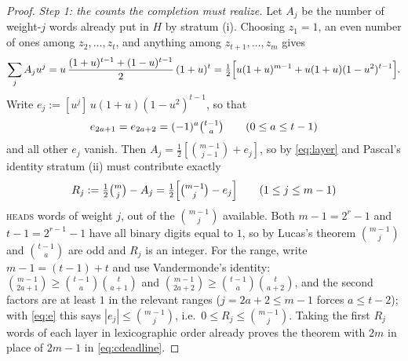 \documentclass[11pt]{article}
\theoremstyle{remark}
\newcommand{\head}{\textnormal{\textsc{heads}}}
\begin{document}
\begin{proof}
\emph{Step 1: the counts the completion must realize.} Let $A_j$ be the
number of weight-$j$ words already put in $H$ by stratum (i). Choosing $z_1=1$,
an even number of ones among $z_2,\dots,z_t$, and anything among
$z_{t+1},\dots,z_m$ gives
\[
\sum_j A_j u^j
= u\,\frac{(1+u)^{t-1}+(1-u)^{t-1}}2\,(1+u)^{t}
= \tfrac12\Bigl[u(1+u)^{m-1}+u(1+u)(1-u^2)^{t-1}\Bigr].
\]
Write $e_j:=[u^j]\,u(1+u)(1-u^2)^{t-1}$, so that
\begin{equation}\label{eq:e}
e_{2a+1}=e_{2a+2}=(-1)^a\tbinom{t-1}a \qquad (0\le a\le t-1)
\end{equation}
and all other $e_j$ vanish. Then $A_j=\tfrac12[\binom{m-1}{j-1}+e_j]$, so by
\eqref{eq:layer} and Pascal's identity stratum (ii) must contribute exactly
\begin{equation}\label{eq:R}
R_j:=\tfrac12\tbinom mj-A_j=\tfrac12\Bigl[\tbinom{m-1}{j}-e_j\Bigr]
\qquad(1\le j\le m-1)
\end{equation}
\head{} words of weight $j$, out of the $\binom{m-1}j$ available. Both
$m-1=2^r-1$ and $t-1=2^{r-1}-1$ have all binary digits equal to $1$, so by
Lucas's theorem $\binom{m-1}j$ and $\binom{t-1}a$ are odd and $R_j$ is an
integer. For the range, write $m-1=(t-1)+t$ and use Vandermonde's identity:
$\binom{m-1}{2a+1}\ge\binom{t-1}a\binom{t}{a+1}$ and
$\binom{m-1}{2a+2}\ge\binom{t-1}a\binom{t}{a+2}$, and the second factors are
at least $1$ in the relevant ranges ($j=2a+2\le m-1$ forces $a\le t-2$); with
\eqref{eq:e} this says $|e_j|\le\binom{m-1}j$, i.e.\
$0\le R_j\le\binom{m-1}j$. Taking the first $R_j$ words of each layer in
lexicographic order already proves the theorem with $2m$ in place of $2m-1$
in \eqref{eq:cdeadline}.


\end{proof}
\end{document}

